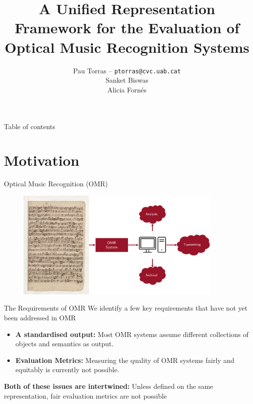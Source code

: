 \documentclass[UKenglish, aspectratio = 169]{beamer}
\author[Torras \textit{\etal}]
{Pau Torras -- \texttt{ptorras@cvc.uab.cat}
\texorpdfstring{\\}{}
Sanket Biswas
\texorpdfstring{\\}{}
Alicia Fornés
}
\title{A Unified Representation Framework for the Evaluation of Optical Music Recognition Systems}
\subtitle{}
\begin{document}
%
%
\begin{frame}{Table of contents}
    \tableofcontents
\end{frame}



\section{Motivation}
\SectionPage

\hidelogo
\begin{frame}[c]{Optical Music Recognition (OMR)}
	\begin{figure}
		\includegraphics[width=0.9\textwidth]{images/omr.pdf}
	\end{figure}
\end{frame}
\showlogo

\begin{frame}[c]{The Requirements of OMR}
	We identify a few key requirements that have not yet been addressed in OMR
	
	\begin{itemize}
	 	\item \textbf{A standardised output:} Most OMR systems assume different
	 	collections of objects and semantics as output.
	 	\item \textbf{Evaluation Metrics:} Measuring the quality of OMR systems 
	 	fairly and equitably is currently not possible.
	\end{itemize}
	\textbf{Both of these issues are intertwined:} Unless defined on the 
	same representation, fair evaluation metrics are not possible
\end{frame}
\end{document}

